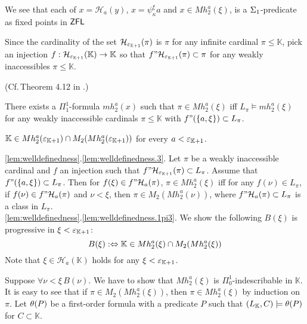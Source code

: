 \documentclass{article}
\newcommand{\mK}{\mathbb{K}}
\begin{document}
We see that each of 
$x=\mathcal{H}_{a}(y)$,
$x=\psi^{\xi}_{\kappa}a$ and
$x\in Mh^{a}_{2}(\xi)$, 
is a $\Sigma_{1}$-predicate as fixed points in $\mbox{{\sf ZFL}}$



Since 
the cardinality of the set $\mathcal{H}_{\veps_{\mK+1}}(\pi)$ is $\pi$ for any infinite
cardinal $\pi\leq\mK$,
pick an injection $f :\mathcal{H}_{\veps_{\mK+1}}(\mK)\to \mK$ so that
$f "\mathcal{H}_{\veps_{\mK+1}}(\pi)\subset\pi$ for any weakly inaccessibles $\pi\leq\mK$.

\begin{lemma}\label{lem:welldefinedness}
{\rm (Cf.\,Theorem 4.12 in \cite{Rathjen94}.)}
\benu

\item\label{lem:welldefinedness.3}
There exists a $\Pi^{1}_{1}$-formula $mh^{a}_{2}(x)$ such that
$\pi\in Mh^{a}_{2}(\xi)$ iff $L_{\pi}\models mh^{a}_{2}(\xi)$ 
for any weakly inaccessible cardinals $\pi\leq\mK$ with $f"(\{a,\xi\})\subset L_{\pi}$.



\item\label{lem:welldefinedness.1pi3}
$\mK\in Mh^{a}_{2}(\veps_{\mK+1})\cap M_{2}(Mh^{a}_{2}(\veps_{\mK+1}))$ for every $a<\veps_{\mK+1}$.

\eenu
\end{lemma}
\bprf
\ref{lem:welldefinedness}.\ref{lem:welldefinedness.3}.
Let $\pi$ be a weakly inaccessible cardinal and
$f$ an injection such that $f"\calh_{\veps_{\mK+1}}(\pi)\subset L_{\pi}$.
Assume that $f"(\{a,\xi\})\subset L_{\pi}$.
Then for $f(\xi)\in f" {\cal H}_{a}(\pi)$,
$\pi\in Mh^{a}_{2}(\xi)$ iff
for any $f(\nu)\in L_{\pi}$,
if $f(\nu)\in f"{\cal H}_{a}(\pi)$ and 
$\nu<\xi$, then $\pi\in M_{2}(Mh^{a}_{2}(\nu))$, where
$f"{\cal H}_{a}(\pi)\subset L_{\pi}$ is a class in $L_{\pi}$.
\\

\noindent
\ref{lem:welldefinedness}.\ref{lem:welldefinedness.1pi3}.
We show the following $B(\xi)$ is progressive in $\xi<\veps_{\mK+1}$:
\[
B(\xi)  :\Lrarw 
 \mK\in Mh^{a}_{2}(\xi)\cap M_{2}(Mh^{a}_{2}(\xi))
\]
Note that $\xi\in \mathcal{H}_{a}(\mK)$ holds for any $\xi<\veps_{\mK+1}$.

 
Suppose $\forall \nu<\xi\, B(\nu)$.
We have to show that $Mh^{a}_{2}(\xi)$ is $\Pi^{1}_{0}$-indescribable in $\mK$.
It is easy to see that if
$\pi\in M_{2}(Mh^{a}_{2}(\xi))$, then $\pi\in Mh^{a}_{2}(\xi)$
by induction on $\pi$.
Let $\theta(P)$ be a first-order formula with a predicate $P$ such that
$(L_{\mK},C)\models\tht(P)$ for $C\subset\mK$.
\end{document}
